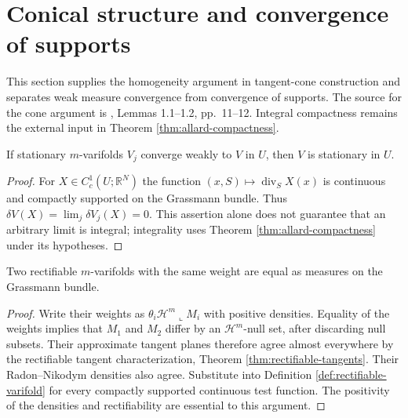 \chapter{Conical structure and convergence of supports}\label{sec:varifold-conical-structure}
This section supplies the homogeneity argument in tangent-cone construction and separates weak measure convergence from convergence of supports. The source for the cone argument is \cite{Minter}, Lemmas 1.1--1.2, pp.~11--12. Integral compactness remains the external input in Theorem \ref{thm:allard-compactness}.

\begin{lemma}\label{lem:stationarity-closed}
If stationary $m$-varifolds $V_j$ converge weakly to $V$ in $U$, then $V$ is stationary in $U$.
\end{lemma}
\begin{proof}
For $X\in C_c^1(U;\mathbb R^N)$ the function $(x,S)\mapsto\operatorname{div}_S X(x)$ is continuous and compactly supported on the Grassmann bundle. Thus $\delta V(X)=\lim_j\delta V_j(X)=0$. This assertion alone does not guarantee that an arbitrary limit is integral; integrality uses Theorem \ref{thm:allard-compactness} under its hypotheses.
\end{proof}

\begin{lemma}\label{lem:rectifiable-lift-unique}
Two rectifiable $m$-varifolds with the same weight are equal as measures on the Grassmann bundle.
\end{lemma}
\begin{proof}
Write their weights as $\theta_i\mathcal H^m\llcorner M_i$ with positive densities. Equality of the weights implies that $M_1$ and $M_2$ differ by an $\mathcal H^m$-null set, after discarding null subsets. Their approximate tangent planes therefore agree almost everywhere by the rectifiable tangent characterization, Theorem \ref{thm:rectifiable-tangents}. Their Radon--Nikodym densities also agree. Substitute into Definition \ref{def:rectifiable-varifold} for every compactly supported continuous test function. The positivity of the densities and rectifiability are essential to this argument.
\end{proof}

